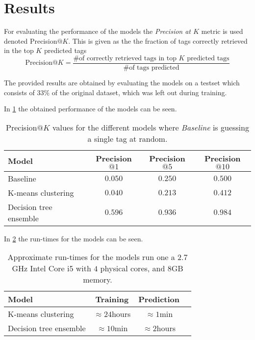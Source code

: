 
\section{Results}

For evaluating the performance of the models the \textit{Precision at $K$} metric
is used denoted Precision$@K$. This is given as the the fraction of tags correctly
retrieved in the top $K$ predicted tags
\begin{equation}
  \text{Precision}@K = \frac{\text{\# of correctly retrieved tags in top }K\text{ predicted tags}}
  {\text{\# of tags predicted}}
\end{equation}

The provided results are obtained by evaluating the models on a testset which
consists of $33\%$ of the original dataset, which was left out during training.

In \cref{tab:results} the obtained performance of the models can be seen.

\begin{table}[H]
  \centering
  \begin{tabular}{l | c c c}
    Model & Precision$@1$ & Precision$@5$ & Precision$@10$ \\ \hline
    Baseline & $0.050$ & $0.250$ & $0.500$ \\
    K-means clustering & $0.040$ & $0.213$ & $0.412$ \\
    Decision tree ensemble & $\mathbf{0.596}$ & $\mathbf{0.936}$ & $\mathbf{0.984}$
  \end{tabular}
  \caption{Precision$@K$ values for the different models where \textit{Baseline}
           is guessing a single tag at random.}
  \label{tab:results}
\end{table}

In \cref{tab:run-times} the run-times for the models can be seen.

\begin{table}[H]
  \centering
  \begin{tabular}{l | c c c}
    Model & Training & Prediction \\ \hline
    K-means clustering & $\approx 24$hours & $\approx 1$min \\
    Decision tree ensemble & $\approx 10$min & $\approx 2$hours
  \end{tabular}
  \caption{Approximate run-times for the models run one a $2.7$ GHz Intel Core i5
           with $4$ physical cores, and $8$GB memory.}
  \label{tab:run-times}
\end{table}
